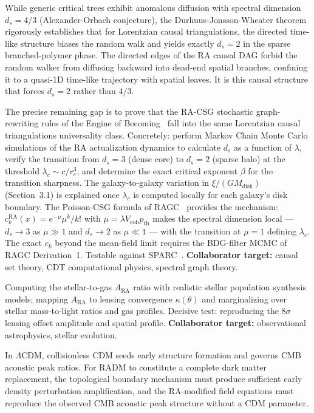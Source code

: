 \documentclass[11pt,a4paper]{article}
\theoremstyle{plain}
\theoremstyle{definition}
\theoremstyle{remark}
\newcommand{\ARA}{A_{\mathrm{RA}}}
\begin{document}
\begin{description}
  While generic critical trees exhibit anomalous diffusion with spectral
  dimension $d_s = 4/3$ (Alexander-Orbach conjecture), the
  Durhuus-Jonsson-Wheater theorem rigorously establishes that for
  Lorentzian causal triangulations, the directed time-like structure biases
  the random walk and yields exactly $d_s = 2$ in the sparse
  branched-polymer phase. The directed edges of the RA causal DAG forbid the
  random walker from diffusing backward into dead-end spatial branches,
  confining it to a quasi-1D time-like trajectory with spatial leaves. It is
  this causal structure that forces $d_s = 2$ rather than $4/3$.

  The precise remaining gap is to prove that the RA-CSG stochastic
  graph-rewriting rules of the Engine of
  Becoming~\citep{Sandeman2026RAEB} fall into the same Lorentzian causal
  triangulations universality class. Concretely: perform Markov Chain Monte
  Carlo simulations of the RA actualization dynamics to calculate $d_s$ as a
  function of $\lambda$, verify the transition from $d_s = 3$ (dense core)
  to $d_s = 2$ (sparse halo) at the threshold $\lambda_c \sim c/r_c^3$, and
  determine the exact critical exponent $\beta$ for the transition sharpness.
  The galaxy-to-galaxy variation in $\xi/(GM_{\mathrm{disk}})$ (Section~3.1)
  is explained once $\lambda_c$ is computed locally for each galaxy's disk
  boundary. The Poisson-CSG formula of RAGC~\citep{Sandeman2026b} provides the
  mechanism: $c_k^{\mathrm{RA}}(x) = e^{-\mu}\mu^k/k!$ with
  $\mu = \lambda V_{\mathrm{coh}} p_{\mathrm{th}}$ makes the spectral
  dimension local --- $d_s \to 3$ as $\mu \gg 1$ and $d_s \to 2$ as
  $\mu \ll 1$ --- with the transition at $\mu = 1$ defining $\lambda_c$.
  The exact $c_k$ beyond the mean-field limit requires the
  BDG-filter MCMC of RAGC Derivation~1. Testable against
  SPARC~\citep{Lelli2016}.
  \textbf{Collaborator target:} causal set theory, CDT computational
  physics, spectral graph theory.

  \item[Hard Wall 3: Quantitative Bullet Cluster.] Computing the stellar-to-gas
  $\ARA$ ratio with realistic stellar population synthesis models; mapping $\ARA$
  to lensing convergence $\kappa(\theta)$ and marginalizing over stellar
  mass-to-light ratios and gas profiles. Decisive test: reproducing the $8\sigma$
  lensing offset amplitude and spatial profile.
  \textbf{Collaborator target:} observational astrophysics, stellar evolution.

  \item[Hard Wall 4: CMB acoustic structure and early structure formation.]
  In $\Lambda$CDM, collisionless CDM seeds early structure formation and
  governs CMB acoustic peak ratios.  For RADM to constitute a complete dark
  matter replacement, the topological boundary mechanism must produce
  sufficient early density perturbation amplification, and the RA-modified
  field equations must reproduce the observed CMB acoustic peak structure
  without a CDM parameter.


\end{description}
\end{document}
